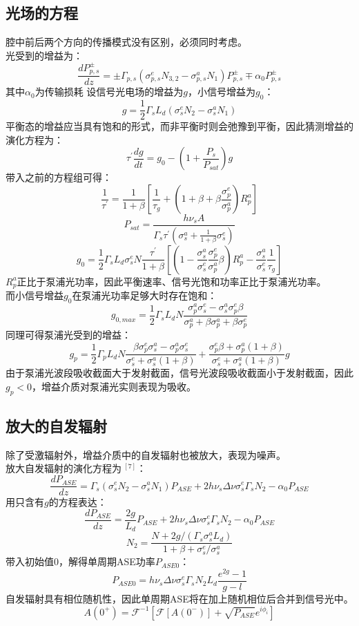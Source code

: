 \subsection{光场的方程}
腔中前后两个方向的传播模式没有区别，必须同时考虑。\\
光受到的增益为：
\[\frac{d P_{p,s}^{\pm}}{dz} = \pm \Gamma_{p,s} (\sigma_{p,s}^e N_{3,2} - \sigma_{p,s}^a N_1) P_{p,s}^{\pm} \mp \alpha_0 P_{p,s}^{\pm}\]
其中$\alpha_0$为传输损耗
设信号光电场的增益为$g$，小信号增益为$g_0$：
\[g = \frac{1}{2} \Gamma_s L_d (\sigma_s^eN_2 - \sigma_s^a N_1)\]
平衡态的增益应当具有饱和的形式，而非平衡时则会弛豫到平衡，因此猜测增益的演化方程为：
\[\tau^\prime \frac{dg}{dt} = g_0 - (1+\frac{P_s}{P_{sat}}) g\]
带入之前的方程组可得：
\[\frac{1}{\tau^\prime} = \frac{1}{1+\beta} [\frac{1}{\tau_g} + (1+\beta+\beta \frac{\sigma_p^e}{\sigma_p^a})R_p^a]\]
\[P_{sat} = \frac{h \nu_s A}{\Gamma_s \tau^\prime (\sigma_s^a + \frac{1}{1+\beta}\sigma_s^e)}\]
\[g_0 = \frac{1}{2} \Gamma_s L_d \sigma_s^e N \frac{\tau^\prime}{1 + \beta} [(1 - \frac{\sigma_s^a}{\sigma_s^e} \frac{\sigma_p^e}{\sigma_p^a} \beta) R_p^a - \frac{\sigma_s^a}{\sigma_s^e} \frac{1}{\tau_g}]\]
$R_p^a$正比于泵浦光功率，因此平衡速率、信号光饱和功率正比于泵浦光功率。\\
而小信号增益$g_0$在泵浦光功率足够大时存在饱和：\\
\[g_{0,max} = \frac{1}{2} \Gamma_s L_d N \frac{\sigma_p^a \sigma_s^e - \sigma_s^a \sigma_p^e \beta}{\sigma_p^a + \beta \sigma_p^a + \beta \sigma_p^e}\]
同理可得泵浦光受到的增益：
\[g_p = \frac{1}{2} \Gamma_p L_d N \frac{\beta \sigma_p^e \sigma_s^a - \sigma_p^a \sigma_s^e}{\sigma_s^e + \sigma_s^a (1 + \beta)} + \frac{\sigma_p^e \beta + \sigma_p^a (1 + \beta)}{\sigma_s^e + \sigma_s^a (1 + \beta)} g\]
由于泵浦光波段吸收截面大于发射截面，信号光波段吸收截面小于发射截面，因此$g_p < 0$，增益介质对泵浦光实则表现为吸收。\\
\subsection{放大的自发辐射}
除了受激辐射外，增益介质中的自发辐射也被放大，表现为噪声。\\
放大自发辐射的演化方程为$~^{[7]}$：
\[\frac{d P_{ASE}}{dz} = \Gamma_s(\sigma_s^e N_2 - \sigma_s^a N_1) P_{ASE} + 2h\nu_s \Delta \nu \sigma_s^e \Gamma_s N_2 - \alpha_0 P_{ASE}\]
用只含有$g$的方程表达：
\[\frac{d P_{ASE}}{dz} = \frac{2g}{L_d} P_{ASE} + 2h\nu_s \Delta \nu \sigma_s^e \Gamma_s N_2 - \alpha_0 P_{ASE}\]
\[N_2 = \frac{N + 2g / (\Gamma_s \sigma_s^a L_d)}{1 + \beta + \sigma_s^e / \sigma_s^a}\]
带入初始值0，解得单周期ASE功率$P_{ASE0}$：
\[P_{ASE0} = h\nu_s \Delta \nu \sigma_s^e \Gamma_s N_2 L_d \frac{e^{2g} - 1}{g - l}\]
自发辐射具有相位随机性，因此单周期ASE将在加上随机相位后合并到信号光中。
\[A(0^+) = \mathcal{F}^{-1}[\mathcal{F}[A(0^-)] + \sqrt{P_{ASE}}e^{i\phi_i}]\]
